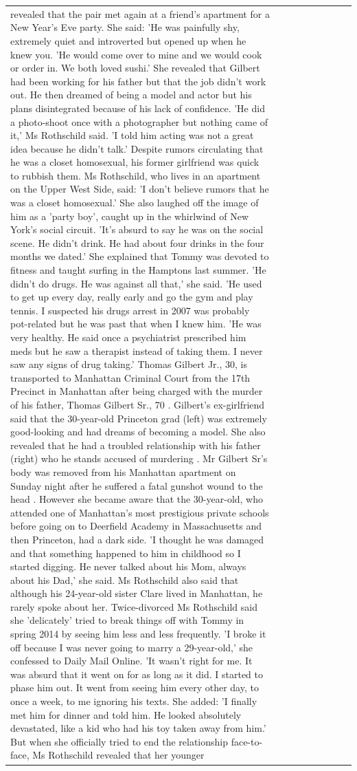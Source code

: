 \begin{table}[H]
\begin{tabular}{lllrlllll}
revealed that the pair met again at a friend’s apartment for a New Year’s Eve party. She said: 'He was painfully shy, extremely quiet and introverted but opened up when he knew you. 'He would come over to mine and we would cook or order in. We both loved sushi.' She revealed that Gilbert had been working for his father but that the job didn't work out. He then dreamed of being a model and actor but his plans disintegrated because of his lack of confidence. 'He did a photo-shoot once with a photographer but nothing came of it,' Ms Rothschild said. 'I told him acting was not a great idea because he didn’t talk.' Despite rumors circulating that he was a closet homosexual, his former girlfriend was quick to rubbish them. Ms Rothschild, who lives in an apartment on the Upper West Side, said: 'I don’t believe rumors that he was a closet homosexual.' She also laughed off the image of him as a 'party boy', caught up in the whirlwind of New York's social circuit. 'It’s absurd to say he was on the social scene. He didn’t drink. He had about four drinks in the four months we dated.' She explained that Tommy was devoted to fitness and taught surfing in the Hamptons last summer. 'He didn’t do drugs. He was against all that,' she said. 'He used to get up every day, really early and go the gym and play tennis. I suspected his drugs arrest in 2007 was probably pot-related but he was past that when I knew him. 'He was very healthy. He said once a psychiatrist prescribed him meds but he saw a therapist instead of taking them. I never saw any signs of drug taking.' Thomas Gilbert Jr., 30, is transported to Manhattan Criminal Court from the 17th Precinct in Manhattan after being charged with the murder of his father, Thomas Gilbert Sr., 70 . Gilbert's ex-girlfriend said that the 30-year-old Princeton grad (left) was extremely good-looking and had dreams of becoming a model. She also revealed that he had a troubled relationship with his father (right) who he stands accused of murdering . Mr Gilbert Sr's body was removed from his Manhattan apartment on Sunday night after he suffered a fatal gunshot wound to the head . However she became aware that the 30-year-old, who attended one of Manhattan's most prestigious private schools before going on to Deerfield Academy in Massachusetts and then Princeton, had a dark side. 'I thought he was damaged and that something happened to him in childhood so I started digging. He never talked about his Mom, always about his Dad,' she said. Ms Rothschild also said that although his 24-year-old sister Clare lived in Manhattan, he rarely spoke about her. Twice-divorced Ms Rothschild said she 'delicately' tried to break things off with Tommy in spring 2014 by seeing him less and less frequently. 'I broke it off because I was never going to marry a 29-year-old,' she confessed to Daily Mail Online. 'It wasn’t right for me. It was absurd that it went on for as long as it did. I started to phase him out. It went from seeing him every other day, to once a week, to me ignoring his texts. She added: 'I finally met him for dinner and told him. He looked absolutely devastated, like a kid who had his toy taken away from him.' But when she officially tried to end the relationship face-to-face, Ms Rothschild revealed that her younger 
\end{tabular}
\end{table}
